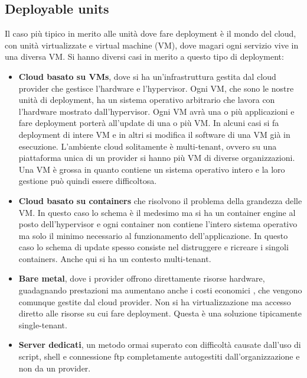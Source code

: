 \subsection{Deployable units}
Il caso più tipico in merito alle unità dove fare deployment è il mondo del cloud,
con unità virtualizzate e virtual machine (VM), dove magari ogni servizio vive in
una diversa VM. Si hanno diversi casi in merito a questo tipo di deployment:
\begin{itemize}
    \item \textbf{Cloud basato su VMs}, dove si ha un'infrastruttura gestita dal
          cloud provider che gestisce l'hardware e l'hypervisor. Ogni VM, che sono le
          nostre unità di deployment, ha un sistema operativo arbitrario che lavora con
          l'hardware mostrato dall'hypervisor. Ogni VM avrà una o più applicazioni e
          fare deployment porterà all'update di una o più VM. In alcuni casi si fa
          deployment di intere VM e in altri si modifica il software di una VM già
          in esecuzione. L'ambiente cloud solitamente è multi-tenant, ovvero su una
          piattaforma unica di un provider si hanno più VM di diverse organizzazioni.
          Una VM è grossa in quanto contiene un sistema operativo intero e la loro
          gestione può quindi essere difficoltosa.
    \item \textbf{Cloud basato su containers} che risolvono il problema della
          grandezza delle VM. In questo caso lo schema è il medesimo ma si ha un container
          engine al posto dell'hypervisor e ogni container non contiene l'intero sistema
          operativo ma solo il minimo necessario al funzionamento dell'applicazione. In
          questo caso lo schema di update spesso consiste nel distruggere e ricreare
          i singoli containers. Anche qui si ha un contesto multi-tenant.
    \item \textbf{Bare metal}, dove i provider offrono direttamente risorse
          hardware, guadagnando prestazioni ma aumentano anche i costi economici ,
          che vengono comunque gestite dal cloud provider. Non si ha virtualizzazione
          ma accesso diretto alle risorse su cui fare deployment. Questa è una soluzione
          tipicamente single-tenant.
    \item \textbf{Server dedicati}, un metodo ormai superato con difficoltà causate
          dall'uso di script, shell e connessione ftp completamente autogestiti
          dall'organizzazione e non da un provider.
\end{itemize}

